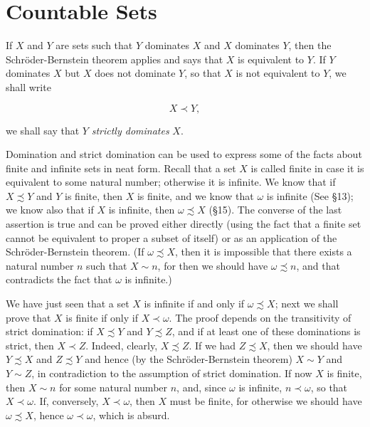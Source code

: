 
\chapter{Countable Sets} 

If $X$ and $Y$ are sets such that $Y$ dominates $X$ and $X$ dominates $Y$, then the Schröder-Bernstein theorem applies and says that $X$ is equivalent to $Y$. If $Y$ dominates $X$ but $X$ does not dominate $Y$, so that $X$ is not equivalent to $Y$, we shall write 

\begin{equation*}
X \prec Y, 
\end{equation*}

we shall say that $Y$ \textit{strictly dominates} $X$.

Domination and strict domination can be used to express some of the facts about finite and infinite sets in neat form. Recall that a set $X$ is called finite in case it is equivalent to some natural number; otherwise it is infinite. We know that if $X \precsim Y$ and $Y$ is finite, then $X$ is finite, and we know that $\omega$ is infinite (See \S 13); we know also that if $X$ is infinite, then $\omega \precsim X$ (\S 15). The converse of the last assertion is true and can be proved either directly (using the fact that a finite set cannot be equivalent to proper a subset of itself) or as an application of the Schröder-Bernstein theorem. (If $\omega \precsim X$, then it is impossible that there exists a natural number $n$ such that $X \sim n$, for then we should have $\omega \precsim n$, and that contradicts the fact that $\omega$ is infinite.) 

We have just seen that a set $X$ is infinite if and only if $\omega \precsim X$; next we shall prove that $X$ is finite if only if $X \prec \omega$. The proof depends on the transitivity of strict domination: if $X \precsim Y$ and $Y \precsim Z$, and if at least one of these dominations is strict, then $X \prec Z$. Indeed, clearly, $X \precsim Z$. If we had $Z \precsim X$, then we should have $Y \precsim X$ and $Z \precsim Y$ and hence (by the Schröder-Bernstein theorem) $X \sim Y$ and $Y \sim Z$, in contradiction to the assumption of strict domination. If now $X$ is finite, then $X \sim n$ for some natural number $n$, and, since $\omega$ is infinite, $n \prec \omega$, so that $X \prec \omega$. If, conversely, $X \prec \omega$, then $X$ must be finite, for otherwise we should have $\omega \precsim X$, hence $\omega \prec \omega$, which is absurd. 

